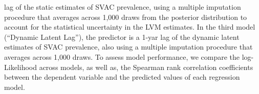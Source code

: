 \begin{table}[h]
\begin{center}
{       lag of the static estimates of SVAC prevalence, using a multiple imputation procedure that averages across 1,000 draws
        from the posterior distribution to account for the statistical uncertainty in the LVM estimates. 
       In the third model (``Dynamic Latent Lag''), the predictor is a 1-yar lag of the dynamic latent 
       estimates of SVAC prevalence, also using a multiple imputation procedure that averages across 1,000 draws. To assess
       model performance, we compare the log-Likelihood across models, as well as, the Spearman rank
       correlation coefficients between the dependent variable and the predicted values of each regression
       model.}
\label{xt-max}
\end{center}
\end{table}
